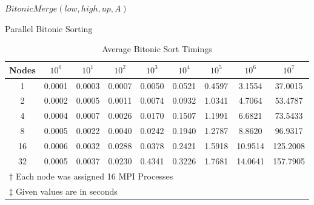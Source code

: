 \documentclass[addpoints]{exam}
\begin{document}
\begin{questions}
\begin{solution}
\begin{algorithm}[H]
\caption{$BitonicMerge(low,high,up,A)$ \cite{bitonic}}
\begin{algorithmic}
    \ENDIF
\ENDFOR
{}
\ENDIF
\end{algorithmic}
\label{alg:bitonic_Merge}
\end{algorithm}

\begin{algorithm}[H]
\caption{Parallel Bitonic Sorting \cite{bitonicMPI}}
\begin{algorithmic}
        \ELSE
        \ENDIF
    \ENDFOR
\ENDFOR
\end{algorithmic}
\label{alg:bitonic_mpi}
\end{algorithm}


\begin{table}[H]
\centering
\caption{Average Bitonic Sort Timings}
\begin{tabular}{ c c c c c c c c c}
\hline\hline
Nodes & $10^{0}$ & $10^{1}$ & $10^{2}$ & $10^{3}$ & $10^{4}$ & $10^{5}$ & $10^{6}$ & $10^{7}$ \\
\hline
1 & 0.0001 & 0.0003 & 0.0007 & 0.0050 & 0.0521 & 0.4597 & 3.1554 & 37.0015\\
2 & 0.0002 & 0.0005 & 0.0011 & 0.0074 & 0.0932 & 1.0341 & 4.7064 & 53.4787\\
4 & 0.0004 & 0.0007 & 0.0026 & 0.0170 & 0.1507 & 1.1991 & 6.6821 & 73.5433\\
8 & 0.0005 & 0.0022 & 0.0040 & 0.0242 & 0.1940 & 1.2787 & 8.8620 & 96.9317\\
16 & 0.0006 & 0.0032 & 0.0288 & 0.0378 & 0.2421 & 1.5918 & 10.9514 & 125.2008\\
32 & 0.0005 & 0.0037 & 0.0230 & 0.4341 & 0.3226 & 1.7681 & 14.0641 & 157.7905\\
\hline\hline
\multicolumn{9}{l}{\scriptsize $\dagger$ Each node was assigned 16 MPI Processes}\\
\multicolumn{9}{l}{\scriptsize $\ddagger$ Given values are in seconds}
\end{tabular}
\label{table:times}
\end{table}


\end{solution}
\end{questions}
\end{document}
